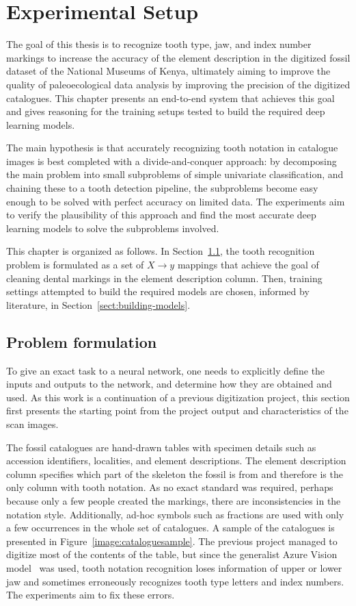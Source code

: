 \documentclass[english,twoside,openright]{UH_DS_MSc}
\begin{document}
\chapter{Experimental Setup}

The goal of this thesis is to recognize tooth type,
jaw, and index number markings to increase the accuracy of the element description in
the digitized fossil dataset of the National Museums of Kenya, ultimately aiming to improve the quality of paleoecological data analysis by improving the precision of the digitized catalogues. This 
chapter presents an end-to-end system that achieves this goal and gives reasoning 
for the training setups tested to build the required deep learning models.

The main hypothesis is that accurately recognizing tooth notation in catalogue images 
is best completed with a divide-and-conquer approach: by decomposing the main problem into small
subproblems of simple univariate classification, and chaining these to a tooth detection pipeline,
the subproblems become easy enough to be solved with perfect accuracy on limited data.
The experiments aim to verify the plausibility of this approach and find the most accurate deep 
learning models to solve the subproblems involved.

This chapter is organized as follows. In Section~\ref{sect:problem-formulation}, the tooth recognition problem is formulated as a set of $X\to y$ 
mappings that achieve the goal of cleaning dental markings in the element description column.
Then, training settings attempted to build the required models are chosen, informed by literature, in Section~\ref{sect:building-models}.

\section{Problem formulation}
\label{sect:problem-formulation}

To give an exact task to a neural network, one needs to explicitly define 
the inputs and outputs to the network, and determine how they are obtained and used.
 As this work is a continuation of 
a previous digitization project, this section first presents the starting point 
from the project output and characteristics of the scan images. 

The fossil catalogues are hand-drawn tables with specimen details such 
as accession identifiers, localities, and element descriptions. The element description 
column specifies which part of the skeleton the fossil is from and therefore is the only 
column with tooth notation.
As no exact standard was required, perhaps because only a few people 
created the markings, there are inconsistencies in the notation style. Additionally,
ad-hoc symbols such as fractions are used with only a few occurrences in the whole set of catalogues. 
A sample of the catalogues is presented in Figure~\ref{image:cataloguesample}.
The previous project managed to digitize most of the contents of the table, but since 
the generalist Azure Vision model~\cite{azurevision} was used, tooth notation recognition
loses information of upper or lower jaw and sometimes
erroneously recognizes tooth type letters and index numbers.
The experiments aim to fix these errors.
\end{document}
